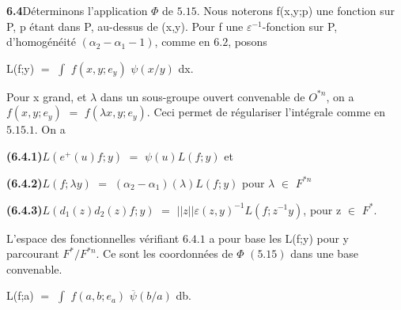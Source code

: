 \documentclass[10pt,a4paper]{article}
\begin{document}
\par\noindent\textbf{6.4}\quad Déterminons l'application $\Phi{}$ de $5.15$. Nous noterons f(x,y;p) une fonction sur P, p étant dans P, au-dessus de (x,y). Pour f une $\varepsilon{}^{-1}$-fonction sur P, d'homogénéité $(\alpha{}_2-\alpha{}_1-1)$, comme en $6.2$, posons\par
\par\smallskip\begin{center}\begin{minipage}{0.96\textwidth}\centering
L(f;y) $=$ $\int{}$ $f(x,y;e_y)$ $\psi{}(x/y)$ dx.
\end{minipage}\end{center}\smallskip
\par Pour x grand, et $\lambda{}$ dans un sous-groupe ouvert convenable de $O^{*n}$, on a $f(x,y;e_y)$ $=$ $f(\lambda{}x,y;e_y)$. Ceci permet de régulariser l'intégrale comme en $5.15.1$. On a\par
\par\noindent\textbf{(6.4.1)}\quad $L(e^+(u)f;y)$ $=$ $\psi{}(u)L(f;y)$ et\par
\par\noindent\textbf{(6.4.2)}\quad $L(f;\lambda{}y)$ $=$ $(\alpha{}_2-\alpha{}_1)(\lambda{})L(f;y)$ pour $\lambda{}$ $\in{}$ $F^{*n}$\par
\par\noindent\textbf{(6.4.3)}\quad $L(d_1(z)d_2(z)f;y)$ $=$ $||z||\varepsilon{}(z,y)^{-1}L(f;z^{-1}y)$, pour z $\in{}$ $F^*$.\par
\par L'espace des fonctionnelles vérifiant $6.4.1$ a pour base les L(f;y) pour y parcourant $F^*/F^{*n}$. Ce sont les coordonnées de $\Phi{}$ $(5.15)$ dans une base convenable.\par
\par\medskip{}\par\smallskip
\par\smallskip\begin{center}\begin{minipage}{0.96\textwidth}\centering
L(f;a) $=$ $\int{}$ $f(a,b;e_a)$ $\overline{\psi{}}(b/a)$ db.
\end{minipage}\end{center}\smallskip
\end{document}
